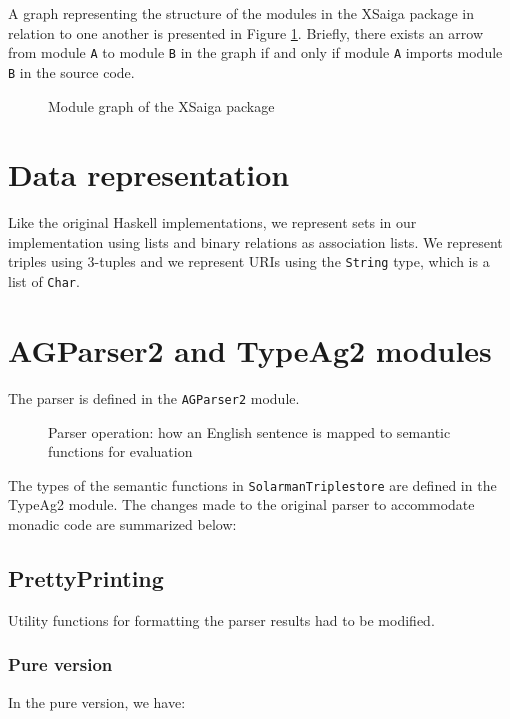 \documentclass[../main.tex]{subfiles}
\begin{document}
A graph representing the structure of the modules in the XSaiga package in relation to one another is presented in Figure \ref{fig:modulegraph}.  Briefly, there exists an arrow from module \texttt{A} to module \texttt{B} in the graph if and only if module \texttt{A} imports module \texttt{B} in the source code.

\begin{figure}[h]
	\centering
	\caption{Module graph of the XSaiga package}
	\label{fig:modulegraph}
\end{figure}

\section{Data representation}

Like the original Haskell implementations, we represent sets in our implementation using lists and binary relations as association lists.  We represent triples using 3-tuples and we represent URIs using the \texttt{String} type, which is a list of \texttt{Char}.


\section{AGParser2 and TypeAg2 modules}

The parser is defined in the \texttt{AGParser2} module.

\begin{figure}[h]
	\centering
	\caption{Parser operation: how an English sentence is mapped to semantic functions for evaluation\cite{graphmqslide}}
\end{figure}

The types of the semantic functions in \texttt{SolarmanTriplestore} are defined in the TypeAg2 module.
The changes made to the original parser to accommodate monadic code are summarized below:

\subsection{PrettyPrinting}
Utility functions for formatting the parser results had to be modified.

\subsubsection{Pure version}
In the pure version, we have:
\end{document}
